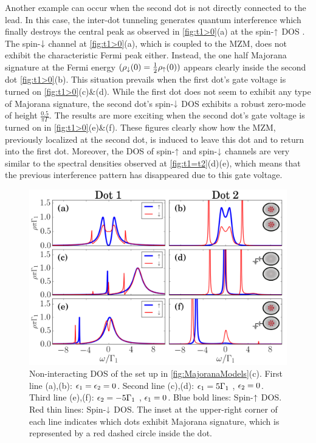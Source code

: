 Another example can  occur when the second dot is not directly connected to the lead. In this case, the inter-dot tunneling generates quantum interference which finally destroys the central peak as observed in \ref{fig:t1>0}(a) at the spin-$\uparrow$ DOS . The spin-$\downarrow$ channel at \ref{fig:t1>0}(a), which is coupled to the MZM, does not exhibit the characteristic Fermi peak either. Instead, the one half Majorana signature at the Fermi energy $(\rho_\downarrow(0) = \frac{1}{2}\rho_\uparrow(0))$ appears clearly inside the second dot \ref{fig:t1>0}(b). This situation prevails when the first dot's gate voltage is turned on \ref{fig:t1>0}(c)\&(d). While the first dot does not seem to exhibit any type of Majorana signature, the second dot's spin-$\downarrow$ DOS exhibits a robust zero-mode of height $\frac{0.5}{\pi \Gamma}$. The results are more exciting when the second dot's gate voltage is turned on in \ref{fig:t1>0}(e)\&(f). These figures clearly show how the MZM, previously localized at the second dot, is induced to leave this dot and to return into the first dot. Moreover, the DOS of spin-$\uparrow$ and spin-$\downarrow$ channels are very similar to the spectral densities observed at \ref{fig:t1=t2}(d)(e), which means that the previous interference pattern has disappeared due to this gate voltage. 

\begin{figure}[bt]
    \begin{center}
    \includegraphics[scale=0.45]{IMAGES/GreenResults/t2>0.png}
    \caption{  \label{fig:t2>0}  Non-interacting DOS of the set up in \ref{fig:MajoranaModels}(c).  First line (a),(b): $\epsilon_1=\epsilon_2=0$. Second line (c),(d): $\epsilon_1=5\Gamma_1$ , $\epsilon_2=0$. Third line (e),(f): $\epsilon_2=-5\Gamma_1$ , $\epsilon_1=0$.   Blue bold lines: Spin-$\uparrow$ DOS. Red thin lines: Spin-$\downarrow$ DOS. The inset at the upper-right corner of each line indicates which dots  exhibit  Majorana signature, which is represented by a red dashed circle inside the dot. \protect\Source{}
    }
    
    \end{center}
\end{figure}


